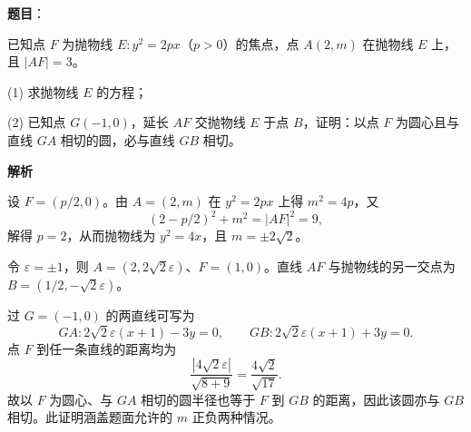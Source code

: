 \begin{answer}

\textbf{题目}：

已知点 \(F\) 为抛物线 \(E:y^2=2px\)（\(p>0\)）的焦点，点 \(A(2,m)\) 在抛物线 \(E\) 上，且 \(|AF|=3\)。

(1) 求抛物线 \(E\) 的方程；

(2) 已知点 \(G(-1,0)\)，延长 \(AF\) 交抛物线 \(E\) 于点 \(B\)，证明：以点 \(F\) 为圆心且与直线 \(GA\) 相切的圆，必与直线 \(GB\) 相切。
\nopagebreak[4]
\begin{center}\end{center}
\nopagebreak[4]
\textbf{解析}


设 \(F=(p/2,0)\)。由 \(A=(2,m)\) 在 \(y^2=2px\) 上得 \(m^2=4p\)，又
\nopagebreak[4]
\[
(2-p/2)^2+m^2=|AF|^2=9,
\]
解得 \(p=2\)，从而抛物线为 \(y^2=4x\)，且 \(m=\pm2\sqrt2\)。


令 \(\varepsilon=\pm1\)，则 \(A=(2,2\sqrt2\varepsilon)\)、\(F=(1,0)\)。直线 \(AF\) 与抛物线的另一交点为 \(B=(1/2,-\sqrt2\varepsilon)\)。

过 \(G=(-1,0)\) 的两直线可写为
\nopagebreak[4]
\[
GA:2\sqrt2\varepsilon(x+1)-3y=0,
\qquad GB:2\sqrt2\varepsilon(x+1)+3y=0.
\]
点 \(F\) 到任一条直线的距离均为
\nopagebreak[4]
\[
\frac{|4\sqrt2\varepsilon|}{\sqrt{8+9}}=\frac{4\sqrt2}{\sqrt{17}}.
\]
故以 \(F\) 为圆心、与 \(GA\) 相切的圆半径也等于 \(F\) 到 \(GB\) 的距离，因此该圆亦与 \(GB\) 相切。此证明涵盖题面允许的 \(m\) 正负两种情况。



\end{answer}
